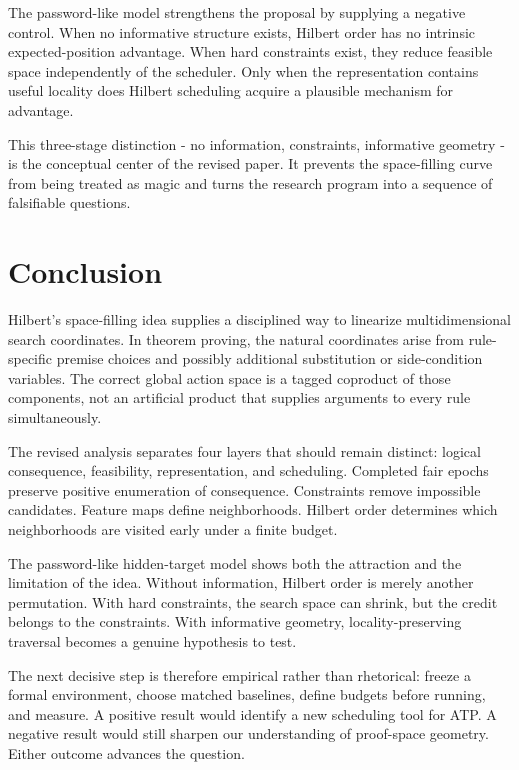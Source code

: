 \documentclass[11pt]{article}
\theoremstyle{hilberttheorem}
\begin{document}
The password-like model strengthens the proposal by supplying a negative control. When no informative structure exists, Hilbert order has no intrinsic expected-position advantage. When hard constraints exist, they reduce feasible space independently of the scheduler. Only when the representation contains useful locality does Hilbert scheduling acquire a plausible mechanism for advantage.

This three-stage distinction - no information, constraints, informative geometry - is the conceptual center of the revised paper. It prevents the space-filling curve from being treated as magic and turns the research program into a sequence of falsifiable questions.

\section{Conclusion}\label{sec:conclusion}
Hilbert's space-filling idea supplies a disciplined way to linearize multidimensional search coordinates. In theorem proving, the natural coordinates arise from rule-specific premise choices and possibly additional substitution or side-condition variables. The correct global action space is a tagged coproduct of those components, not an artificial product that supplies arguments to every rule simultaneously.

The revised analysis separates four layers that should remain distinct: logical consequence, feasibility, representation, and scheduling. Completed fair epochs preserve positive enumeration of consequence. Constraints remove impossible candidates. Feature maps define neighborhoods. Hilbert order determines which neighborhoods are visited early under a finite budget.

The password-like hidden-target model shows both the attraction and the limitation of the idea. Without information, Hilbert order is merely another permutation. With hard constraints, the search space can shrink, but the credit belongs to the constraints. With informative geometry, locality-preserving traversal becomes a genuine hypothesis to test.

The next decisive step is therefore empirical rather than rhetorical: freeze a formal environment, choose matched baselines, define budgets before running, and measure. A positive result would identify a new scheduling tool for ATP. A negative result would still sharpen our understanding of proof-space geometry. Either outcome advances the question.
\end{document}
